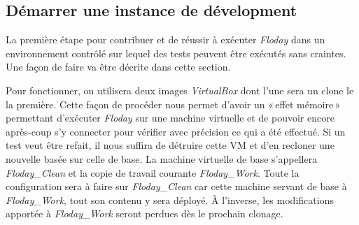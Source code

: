 \subsection{Démarrer une instance de dévelopment}

La première étape pour contribuer et de réussir à exécuter \emph{Floday} dans un environnement contrôlé sur lequel des tests peuvent être exécutés sans craintes.
Une façon de faire va être décrite dans cette section.

Pour fonctionner, on utilisera deux images \emph{VirtualBox} dont l'une sera un clone le la première.
Cette façon de procéder nous permet d'avoir un «\,effet mémoire\,» permettant d'exécuter \emph{Floday} sur une machine virtuelle et de pouvoir encore après-coup s'y connecter pour vérifier avec précision ce qui a été effectué.
Si un test veut être refait, il nous suffira de détruire cette VM et d'en recloner une nouvelle basée sur celle de base.
La machine virtuelle de base s'appellera \emph{Floday\_Clean} et la copie de travail courante \emph{Floday\_Work}.
Toute la configuration sera à faire sur \emph{Floday\_Clean} car cette machine servant de base à \emph{Floday\_Work}, tout son contenu y sera déployé.
À l'inverse, les modifications apportée à \emph{Floday\_Work} seront perdues dès le prochain clonage.


